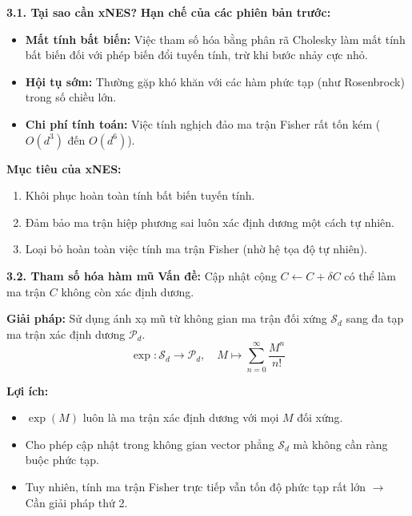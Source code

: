 \documentclass[10pt,xcolor=dvipsnames]{beamer}
\begin{document}
\begin{frame}{\textbf{3.1. Tại sao cần xNES?}}
	\textbf{Hạn chế của các phiên bản trước:}
	\begin{itemize}
		\item \textbf{Mất tính bất biến:} Việc tham số hóa bằng phân rã Cholesky làm mất tính bất biến đối với phép biến đổi tuyến tính, trừ khi bước nhảy cực nhỏ.
		\item \textbf{Hội tụ sớm:} Thường gặp khó khăn với các hàm phức tạp (như Rosenbrock) trong số chiều lớn.
		\item \textbf{Chi phí tính toán:} Việc tính nghịch đảo ma trận Fisher rất tốn kém ($O(d^3)$ đến $O(d^6)$).
	\end{itemize}
	
	\textbf{Mục tiêu của xNES:}
	\begin{enumerate}
		\item Khôi phục hoàn toàn tính bất biến tuyến tính.
		\item Đảm bảo ma trận hiệp phương sai luôn xác định dương một cách tự nhiên.
		\item Loại bỏ hoàn toàn việc tính ma trận Fisher (nhờ hệ tọa độ tự nhiên).
	\end{enumerate}
\end{frame}

\begin{frame}{\textbf{3.2. Tham số hóa hàm mũ}}
	\textbf{Vấn đề:} Cập nhật cộng $C \leftarrow C + \delta C$ có thể làm ma trận $C$ không còn xác định dương.
	
	\textbf{Giải pháp:} Sử dụng ánh xạ mũ từ không gian ma trận đối xứng $\mathcal{S}_d$ sang đa tạp ma trận xác định dương $\mathcal{P}_d$.
	\[ \exp: \mathcal{S}_d \to \mathcal{P}_d, \quad M \mapsto \sum_{n=0}^\infty \frac{M^n}{n!} \]
	
	\textbf{Lợi ích:}
	\begin{itemize}
		\item $\exp(M)$ luôn là ma trận xác định dương với mọi $M$ đối xứng.
		\item Cho phép cập nhật trong không gian vector phẳng $\mathcal{S}_d$ mà không cần ràng buộc phức tạp.
		\item Tuy nhiên, tính ma trận Fisher trực tiếp vẫn tốn độ phức tạp rất lớn $\to$ Cần giải pháp thứ 2.
	\end{itemize}
\end{frame}
\end{document}
